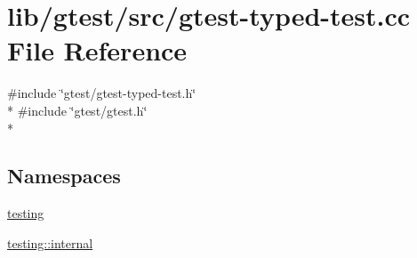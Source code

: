 \hypertarget{gtest-typed-test_8cc}{\section{lib/gtest/src/gtest-\/typed-\/test.cc File Reference}
\label{gtest-typed-test_8cc}
}
{\ttfamily \#include \char`\"{}gtest/gtest-\/typed-\/test.\-h\char`\"{}}\\*
{\ttfamily \#include \char`\"{}gtest/gtest.\-h\char`\"{}}\\*
\subsection*{Namespaces}
\begin{DoxyCompactItemize}
\item 
\hyperlink{namespacetesting}{testing}
\item 
\hyperlink{namespacetesting_1_1internal}{testing\-::internal}
\end{DoxyCompactItemize}
